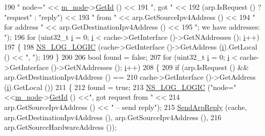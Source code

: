 \begin{DoxyCode}
190                 \textcolor{stringliteral}{" node="} << \hyperlink{classns3_1_1ArpL3Protocol_aa1a2d173cfb3fd7e2f8eff8504a114da}{m\_node}->\hyperlink{classns3_1_1Node_aaf49b64a843565ce3812326313b370ac}{GetId} () <<
191                 \textcolor{stringliteral}{", got "} <<
192                 (arp.IsRequest () ? \textcolor{stringliteral}{"request"} : \textcolor{stringliteral}{"reply"}) <<
193                 \textcolor{stringliteral}{" from "} << arp.GetSourceIpv4Address () <<
194                 \textcolor{stringliteral}{" for address "} << arp.GetDestinationIpv4Address () <<
195                 \textcolor{stringliteral}{"; we have addresses: "});
196   \textcolor{keywordflow}{for} (uint32\_t \hyperlink{bernuolliDistribution_8m_a6f6ccfcf58b31cb6412107d9d5281426}{i} = 0; \hyperlink{bernuolliDistribution_8m_a6f6ccfcf58b31cb6412107d9d5281426}{i} < cache->GetInterface ()->GetNAddresses (); \hyperlink{bernuolliDistribution_8m_a6f6ccfcf58b31cb6412107d9d5281426}{i}++)
197     \{
198       \hyperlink{group__logging_ga88acd260151caf2db9c0fc84997f45ce}{NS\_LOG\_LOGIC} (cache->GetInterface ()->GetAddress (\hyperlink{bernuolliDistribution_8m_a6f6ccfcf58b31cb6412107d9d5281426}{i}).GetLocal () << \textcolor{stringliteral}{", "});
199     \}
200 
206   \textcolor{keywordtype}{bool} found = \textcolor{keyword}{false};
207   \textcolor{keywordflow}{for} (uint32\_t \hyperlink{bernuolliDistribution_8m_a6f6ccfcf58b31cb6412107d9d5281426}{i} = 0; \hyperlink{bernuolliDistribution_8m_a6f6ccfcf58b31cb6412107d9d5281426}{i} < cache->GetInterface ()->GetNAddresses (); \hyperlink{bernuolliDistribution_8m_a6f6ccfcf58b31cb6412107d9d5281426}{i}++)
208     \{
209       \textcolor{keywordflow}{if} (arp.IsRequest () && arp.GetDestinationIpv4Address () == 
210           cache->GetInterface ()->GetAddress (\hyperlink{bernuolliDistribution_8m_a6f6ccfcf58b31cb6412107d9d5281426}{i}).GetLocal ())
211         \{
212           found = \textcolor{keyword}{true};
213           \hyperlink{group__logging_ga88acd260151caf2db9c0fc84997f45ce}{NS\_LOG\_LOGIC} (\textcolor{stringliteral}{"node="}<<\hyperlink{classns3_1_1ArpL3Protocol_aa1a2d173cfb3fd7e2f8eff8504a114da}{m\_node}->\hyperlink{classns3_1_1Node_aaf49b64a843565ce3812326313b370ac}{GetId} () <<\textcolor{stringliteral}{", got request from "} << 
214                         arp.GetSourceIpv4Address () << \textcolor{stringliteral}{" -- send reply"});
215           \hyperlink{classns3_1_1ArpL3Protocol_a2e1f058ec7982637902e91cb2e63b12c}{SendArpReply} (cache, arp.GetDestinationIpv4Address (), arp.GetSourceIpv4Address (),
216                         arp.GetSourceHardwareAddress ());

\end{DoxyCode}
